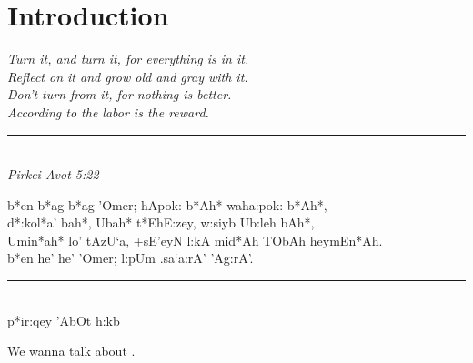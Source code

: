 \chapter{Introduction}

\begin{flushleft}
	\emph{Turn it, and turn it, for everything is in it.}\\
	\emph{Reflect on it and grow old and gray with it.}\\
	\emph{Don't turn from it, for nothing is better.}\\
	\emph{According to the labor is the reward.}\\
	\rule[0pt]{15em}{0.5pt}\\
	\emph{Pirkei Avot 5:22}
\end{flushleft}
\vspace{-8.59em}

\begin{cjhebrew}
	b*en b*ag b*ag 'Omer;
	hApok: b*Ah* waha:pok: b*Ah*\textnormal{,}\\
	d*:kol*a' bah*\textnormal{,}
	Ubah* t*EhE:zey\textnormal{,}
	w:siyb Ub:leh bAh*\textnormal{,}\\
	Umin*ah* lo' tAzU`a\textnormal{,}
	+sE'eyN l:kA mid*Ah TObAh heymEn*Ah\textnormal{.}\\
	b*en he' he' 'Omer;
	l:pUm .sa`a:rA' 'Ag:rA'\textnormal{.}\\
	\rule[0pt]{15em}{0.5pt}\\
	p*ir:qey 'AbOt h\textnormal{:}kb
\end{cjhebrew}

\vspace{2em}

We wanna talk about \cite{milnor1963groups}.

\lipsum[1-10]
